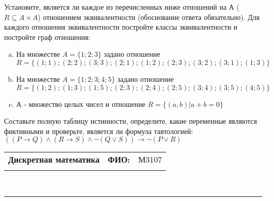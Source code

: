 \documentclass[10pt]{exam}
\newcommand{\class}{Дискретная математика}
\newcommand{\examdate}{}
\begin{document}
\begin{questions}
\question
Установите, является ли каждое из перечисленных ниже отношений на А ($R \subseteq A \times A$) отношением эквивалентности (обоснование ответа обязательно). Для каждого отношения эквивалентности постройте классы 
эквивалентности и постройте граф отношения:
\begin{enumerate} [a)]\setcounter{enumi}{0}
\item На множестве $A = \{1; 2; 3\}$ задано отношение $R = \{(1; 1); (2; 2); (3; 3); (2; 1); (1; 2); (2; 3); (3; 2); (3; 1); (1; 3)\}$
\item На множестве $A = \{1; 2; 3; 4; 5\}$ задано отношение $R = \{(1; 2); (1; 3); (1; 5); (2; 3); (2; 4); (2; 5); (3; 4); (3; 5); (4; 5)\}$
\item А - множество целых чисел и отношение $R = \{(a,b)|a + b = 0\}$
\end{enumerate}\question Составьте полную таблицу истинности, определите, какие переменные являются фиктивными и проверьте, является ли формула тавтологией:
$((P \rightarrow Q) \land (R \rightarrow S) \land \neg (Q \lor S)) \rightarrow \neg (P \lor R)$

\end{questions}
\newpage
\begin{flushright}
\begin{tabular}{p{2.8in} r l}
\textbf{\class} & \textbf{ФИО:} &М3107
\\

\textbf{\examdate} &&\\
\end{tabular}\\
\end{flushright}
\rule[1ex]{\textwidth}{.1pt}
\end{document}
